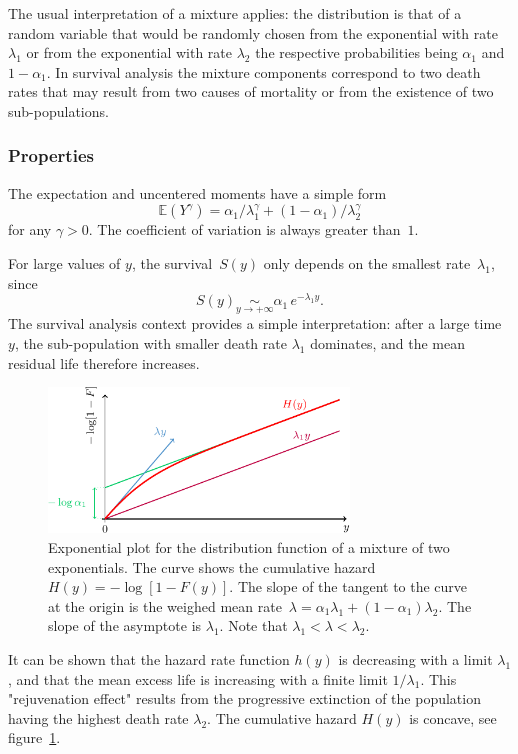 \documentclass[a4paper]{report}
\newcommand{\Esp}{\mathbb{E}}
\begin{document}
The usual interpretation of a mixture applies: the distribution is
that of a random variable that would be randomly chosen from the
exponential with rate $\lambda_1$ or from the exponential with rate
$\lambda_2$ the respective probabilities being $\alpha_1$ and
$1-\alpha_1$.  In survival analysis the mixture components correspond
to two death rates that may result from two causes of mortality or
from the existence of two sub-populations.


\subsubsection*{Properties}
The expectation and uncentered moments have a simple form
$$
   \Esp(Y^\gamma) = \alpha_1/\lambda_1^\gamma + (1-\alpha_1)/\lambda_2^\gamma
$$
for any $\gamma>0$. The coefficient of variation is always greater
than~$1$.

For large values of $y$, the survival~$S(y)$ only depends on the
smallest rate~$\lambda_1$, since
\begin{equation}
    \label{eq:MIXEXPAPP}
    S(y) \underset{y \rightarrow +\infty}{\sim} \alpha_1 \,e^{-\lambda_1 y}.
\end{equation}
The survival analysis context provides a simple interpretation: after
a large time~$y$, the sub-population with smaller death rate
$\lambda_1$ dominates, and the mean residual life therefore increases.

\begin{figure}
  \centering
  \includegraphics[width=8cm]{images/MixExp2.pdf}
  \caption{\label{MIXEXP} Exponential plot for the distribution
    function of a mixture of two exponentials. The curve shows the
    cumulative hazard $H(y) = -\log[1-F(y)]$.
    The slope of the tangent to the curve
    at the origin is the weighed mean rate~$\lambda = \alpha_1 \lambda_1 + (1-\alpha_1) \lambda_2$. 
    The slope of the asymptote is $\lambda_1$.  Note that $\lambda_1 < \lambda < \lambda_2$.
   }
\end{figure}

It can be shown that the hazard rate function $h(y)$ is decreasing with
a limit $\lambda_1$, and that the mean excess life is increasing with 
a finite limit $1/\lambda_1$. This "rejuvenation effect" results from 
the progressive extinction of the population having the highest death
rate $\lambda_2$. The cumulative hazard $H(y)$ is concave, see 
figure~\ref{MIXEXP}.
\end{document}
